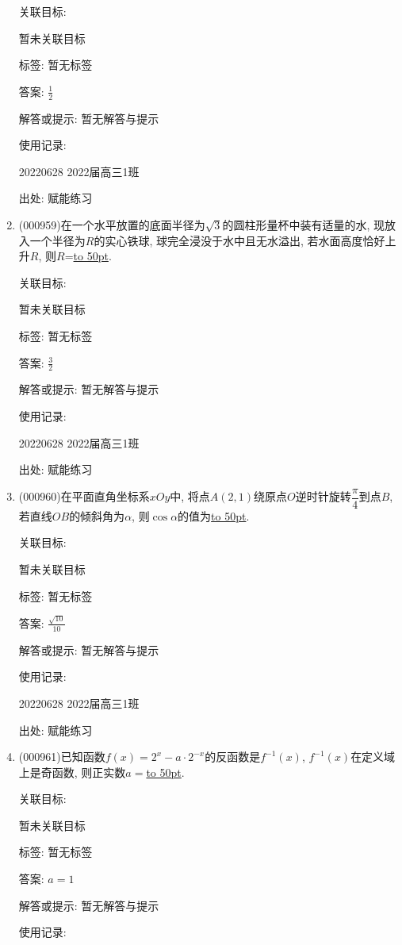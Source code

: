 \documentclass[10pt,a4paper]{article}
\newcommand{\blank}[1]{\underline{\hbox to #1pt{}}}
\begin{document}
\begin{enumerate}[1.]
关联目标:

暂未关联目标



标签: 暂无标签

答案: $\frac 12$

解答或提示: 暂无解答与提示

使用记录:

20220628	2022届高三1班	


出处: 赋能练习
\item { (000959)}在一个水平放置的底面半径为$\sqrt 3$的圆柱形量杯中装有适量的水, 现放入一个半径为$R$的实心铁球, 球完全浸没于水中且无水溢出, 若水面高度恰好上升$R$, 则$R$=\blank{50}.


关联目标:

暂未关联目标



标签: 暂无标签

答案: $\frac 32$

解答或提示: 暂无解答与提示

使用记录:

20220628	2022届高三1班	


出处: 赋能练习
\item { (000960)}在平面直角坐标系$xOy$中, 将点$A(2,1)$绕原点$O$逆时针旋转$\dfrac\pi 4$到点$B$, 若直线$OB$的倾斜角为$\alpha$, 则$\cos \alpha$的值为\blank{50}.


关联目标:

暂未关联目标



标签: 暂无标签

答案: $\frac{\sqrt{10}}{10}$

解答或提示: 暂无解答与提示

使用记录:

20220628	2022届高三1班	


出处: 赋能练习
\item { (000961)}已知函数$f(x)=2^x-a\cdot 2^{-x}$的反函数是$f^{-1}(x)$, $f^{-1}(x)$在定义域上是奇函数, 则正实数$a=$\blank{50}.


关联目标:

暂未关联目标



标签: 暂无标签

答案: $a=1$

解答或提示: 暂无解答与提示

使用记录:


\end{enumerate}
\end{document}
